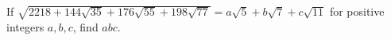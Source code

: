 If $\sqrt{2218+144\sqrt{35}+176\sqrt{55}+198\sqrt{77}}=a\sqrt5+b\sqrt7+c\sqrt{11}$ for positive integers $a,b,c$, find $abc$.
